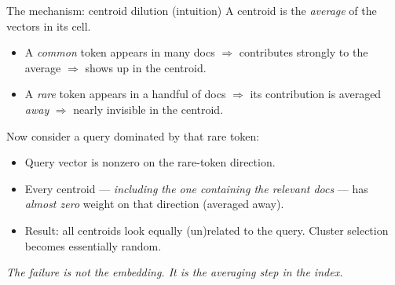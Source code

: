 \begin{frame}{The mechanism: centroid dilution (intuition)}
  A centroid is the \emph{average} of the vectors in its cell.

  \medskip
  \begin{itemize}
    \item A \emph{common} token appears in many docs $\Rightarrow$ contributes
          strongly to the average $\Rightarrow$ shows up in the centroid.
    \item A \emph{rare} token appears in a handful of docs $\Rightarrow$ its
          contribution is averaged \emph{away} $\Rightarrow$ nearly invisible
          in the centroid.
  \end{itemize}

  \medskip
  Now consider a query dominated by that rare token:
  \begin{itemize}
    \item Query vector is nonzero on the rare-token direction.
    \item Every centroid --- \emph{including the one containing the relevant docs} ---
          has \emph{almost zero} weight on that direction (averaged away).
    \item Result: \alert{all centroids look equally (un)related to the query}.
          Cluster selection becomes essentially random.
  \end{itemize}

  \medskip
  \emph{The failure is not the embedding. It is the averaging step in the index.}
\end{frame}

